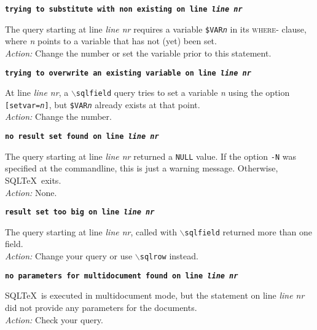 \documentclass{article}
\newcommand{\bs}{\ensuremath{\backslash}}
\newcommand{\vs}{\vspace{3mm}}
\begin{document}
\vs

\noindent\textbf{\texttt{trying to substitute with non existing on line \textit{line nr}}}

\vspace{1mm}

\noindent The query starting at line \textit{line nr} requires a variable \texttt{\$VAR\textit{n}} in its
\textsc{where}- clause, where \textit{n} points to a variable that has not (yet) been set. \\
\textit{Action:} Change the number or set the variable prior to this statement.

\vs

\noindent\textbf{\texttt{trying to overwrite an existing variable on line \textit{line nr}}}

\vspace{1mm}

\noindent At line \textit{line nr}, a \texttt{\bs sqlfield} query tries to set a variable \textit{n}
using the option \texttt{[setvar=\textit{n}]}, but \texttt{\$VAR\textit{n}} already
exists at that point. \\
\textit{Action:} Change the number.

\vs

\noindent\textbf{\texttt{no result set found on line \textit{line nr}}}

\vspace{1mm}

\noindent The query starting at line \textit{line nr} returned a \texttt{NULL} value. If the
option \texttt{-N} was specified at the commandline, this is just a warning message.
Otherwise, SQL\TeX\ exits. \\
\textit{Action:} None.

\vs

\noindent\textbf{\texttt{result set too big on line \textit{line nr}}}

\vspace{1mm}

\noindent The query starting at line \textit{line nr}, called with \texttt{\bs sqlfield} returned more than one field. \\
\textit{Action:} Change your query or use \texttt{\bs sqlrow} instead.

\vs

\noindent\textbf{\texttt{no parameters for multidocument found on line \textit{line nr}}}

\vspace{1mm}

\noindent SQL\TeX\ is executed in multidocument mode, but the statement on line
\textit{line nr} did not provide any parameters for the documents. \\
\textit{Action:} Check your query.
\end{document}
